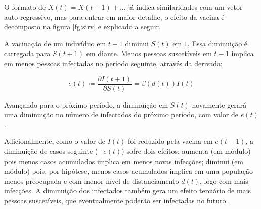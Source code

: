 \documentclass[
	12pt,				%
	oneside,			%
	a4paper,			%
	english,			%
	brazil				%
	hyperref = {colorlinks, citecolor=c1d, linkcolor=c2d, urlcolor=c3d, colorlinks}
	]{abntex2}
\newcounter{j}
\begin{document}
O formato de $X(t) = X(t-1) + ...$ já indica similaridades com um vetor auto-regressivo, mas para entrar em maior detalhe, o efeito da vacina é decomposto na figura \ref{fg:sirv} e explicado a seguir.

A vacinação de um indivíduo em $t-1$ diminui $S(t)$ em $1$. Essa diminuição é carregada para $S(t+1)$ em diante. Menos pessoas suscetíveis em $t-1$ implica em menos pessoas infectadas no período seguinte, através da derivada:

$$e(t) \coloneqq \frac{\partial I(t+1)}{\partial S(t)} = \beta(d(t))I(t)$$

Avançando para o próximo período, a diminuição em $S(t)$ novamente gerará uma diminuição no número de infectados do próximo período, com valor de $e(t)$.

Adicionalmente, como o valor de $I(t)$ foi reduzido pela vacina em $e(t-1)$, a diminuição de casos seguinte ($-e(t)$) sofre dois efeitos: aumenta (em módulo) pois menos casos acumulados implica em menos novas infecções; diminui (em módulo) pois, por hipótese, menos casos acumulados implica em uma população menos preocupada e com menor nível de distanciamento $d(t)$, logo com mais infecções. A diminuição dos infectados também gera um efeito terciário de mais pessoas suscetíveis, que eventualmente poderão ser infectadas no futuro.
\end{document}
